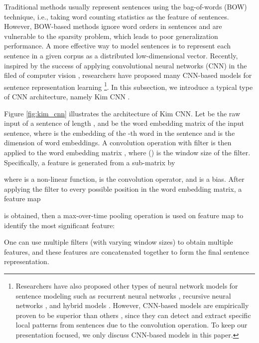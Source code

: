 \documentclass[sigconf]{acmart}
\begin{document}
		Traditional methods \cite{agarwal2009regression, wang2017joint} usually represent sentences using the bag-of-words (BOW) technique, i.e., taking word counting statistics as the feature of sentences.
		However, BOW-based methods ignore word orders in sentences and are vulnerable to the sparsity problem, which leads to poor generalization performance.
		A more effective way to model sentences is to represent each sentence in a given corpus as a distributed low-dimensional vector.
		Recently, inspired by the success of applying convolutional neural networks (CNN) in the filed of computer vision \cite{krizhevsky2012imagenet}, researchers have proposed many CNN-based models for sentence representation learning \cite{kim2014convolutional, kalchbrenner2014convolutional, zhang2015character, conneau2016very} \footnote{Researchers have also proposed other types of neural network models for sentence modeling such as recurrent neural networks \cite{tai2015improved}, recursive neural networks \cite{socher2013recursive}, and hybrid models \cite{lai2015recurrent}. However, CNN-based models are empirically proven to be superior than others \cite{hong2015sentiment}, since they can detect and extract specific local patterns from sentences due to the convolution operation. To keep our presentation focused, we only discuss CNN-based models in this paper.}.
		In this subsection, we introduce a typical type of CNN architecture, namely Kim CNN \cite{kim2014convolutional}.
		
		Figure \ref{fig:kim_cnn} illustrates the architecture of Kim CNN.
		Let  be the raw input of a sentence of length , and  be the word embedding matrix of the input sentence, where  is the embedding of the -th word in the sentence and  is the dimension of word embeddings.
		A convolution operation with filter  is then applied to the word embedding matrix , where  () is the window size of the filter.
		Specifically, a feature  is generated from a sub-matrix  by
		
		where  is a non-linear function,  is the convolution operator, and  is a bias.
		After applying the filter to every possible position in the word embedding matrix, a feature map
		
		is obtained, then a max-over-time pooling operation is used on feature map  to identify the most significant feature:
		
		One can use multiple filters (with varying window sizes) to obtain multiple features, and these features are concatenated together to form the final sentence representation.
		
\end{document}

